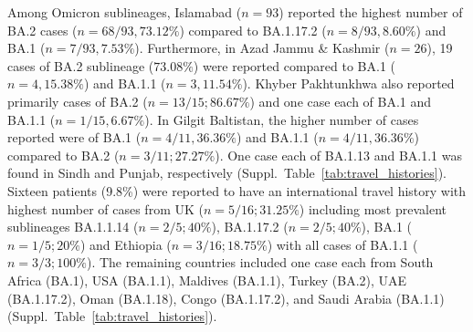 Among Omicron sublineages, Islamabad ($n=93$) reported the highest number of BA.2 cases ($n=68/93, 73.12\%$) compared to BA.1.17.2 ($n=8/93, 8.60\%$) and BA.1 ($n=7/93, 7.53\%$).
Furthermore, in Azad Jammu \& Kashmir ($n=26$), 19 cases of BA.2 sublineage ($73.08\%$) were reported compared to BA.1 ($n=4, 15.38\%$) and BA.1.1 ($n=3, 11.54\%$).
Khyber Pakhtunkhwa also reported primarily cases of BA.2 ($n=13/15; 86.67\%$) and one case each of BA.1 and BA.1.1 ($n=1/15, 6.67\%$).
In Gilgit Baltistan, the higher number of cases reported were of BA.1 ($n=4/11, 36.36\%$) and BA.1.1 ($n=4/11, 36.36\%$) compared to BA.2 ($n=3/11; 27.27\%$).
One case each of BA.1.13 and BA.1.1 was found in Sindh and Punjab, respectively (Suppl.~Table~\ref{tab:travel_histories}).
Sixteen patients (9.8\%) were reported to have an international travel history with highest number of cases from UK ($n=5/16; 31.25\%$) including most prevalent sublineages BA.1.1.14 ($n=2/5; 40\%$), BA.1.17.2 ($n=2/5; 40\%$), BA.1 ($n=1/5; 20\%$) and Ethiopia ($n=3/16; 18.75\%$) with all cases of BA.1.1 ($n=3/3; 100\%$).
The remaining countries included one case each from South Africa (BA.1), USA (BA.1.1), Maldives (BA.1.1), Turkey (BA.2), UAE (BA.1.17.2), Oman (BA.1.18), Congo (BA.1.17.2), and Saudi Arabia (BA.1.1) (Suppl.~Table~\ref{tab:travel_histories}).


